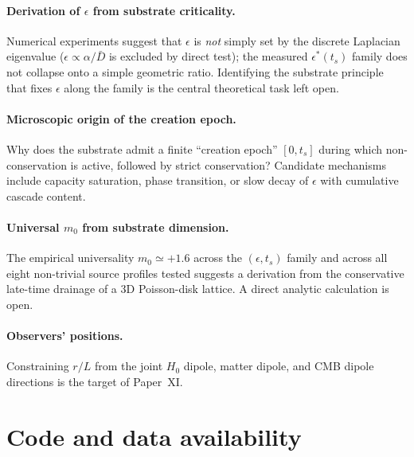 \documentclass[11pt,a4paper]{article}
\begin{document}
\paragraph{Derivation of $\epsilon$ from substrate criticality.}
Numerical experiments suggest that $\epsilon$ is \emph{not} simply
set by the discrete Laplacian eigenvalue ($\epsilon \propto
\alpha/\bar D$ is excluded by direct test); the measured
$\epsilon^*(t_s)$ family does not collapse onto a simple geometric
ratio. Identifying the substrate principle that fixes $\epsilon$
along the family is the central theoretical task left open.

\paragraph{Microscopic origin of the creation epoch.}
Why does the substrate admit a finite ``creation epoch'' $[0, t_s]$
during which non-conservation is active, followed by strict
conservation? Candidate mechanisms include capacity saturation,
phase transition, or slow decay of $\epsilon$ with cumulative
cascade content.

\paragraph{Universal $m_0$ from substrate dimension.}
The empirical universality $m_0 \simeq +1.6$ across the
$(\epsilon, t_s)$ family and across all eight non-trivial source
profiles tested suggests a derivation from the conservative late-time
drainage of a 3D Poisson-disk lattice. A direct analytic calculation
is open.

\paragraph{Observers' positions.}
Constraining $r/L$ from the joint $H_0$ dipole, matter dipole, and
CMB dipole directions is the target of Paper~XI.

\FloatBarrier
\section{Code and data availability}
\label{sec:code}
\end{document}
